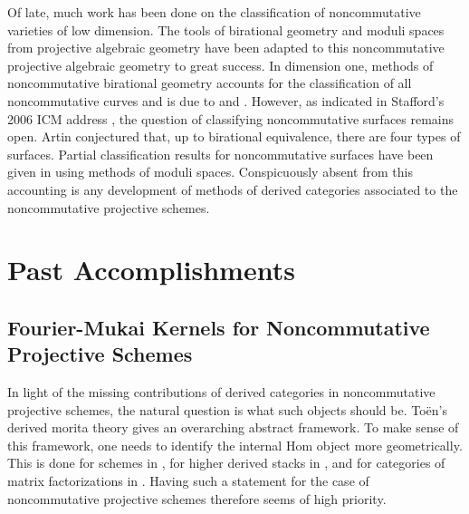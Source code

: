 \documentclass[11pt]{article}
\begin{document}
Of late, much work has been done on the classification of noncommutative varieties of low dimension.
The tools of birational geometry and moduli spaces from projective algebraic geometry have been adapted to this noncommutative projective algebraic geometry to great success.%
In dimension one, methods of noncommutative birational geometry accounts for the classification of all noncommutative curves and is due to \cite{AS95} and \cite{Reiten-VdB}.
However, as indicated in Stafford's 2006 ICM address \cite{Stafford02}, the question of classifying noncommutative surfaces remains open.
Artin conjectured that, up to birational equivalence, there are four types of surfaces.
Partial classification results for noncommutative surfaces have been given in \cite{ATV,Stephenson96,Stephenson97} using methods of moduli spaces.
Conspicuously absent from this accounting is any development of methods of derived categories associated to the noncommutative projective schemes.
\section{Past Accomplishments}

\subsection{Fourier-Mukai Kernels for Noncommutative Projective Schemes}
In light of the missing contributions of derived categories in noncommutative projective schemes, the natural question is what such objects should be.
To\"en's derived morita theory \cite{Toen} gives an overarching abstract framework.
To make sense of this framework, one needs to identify the internal Hom object more geometrically.
This is done for schemes in \cite{Toen}, for higher derived stacks in \cite{BFN}, and for categories of matrix factorizations in \cite{dyck,PV,BFK}.
Having such a statement for the case of noncommutative projective schemes therefore seems of high priority.
\end{document}
